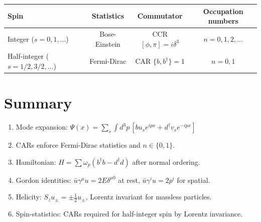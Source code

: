 \documentclass[12pt]{article}
\begin{document}
\begin{center}
\begin{tabular}{l|c|c|c}
Spin & Statistics & Commutator & Occupation numbers \\ \hline
Integer ($s=0,1,\dots$) & Bose-Einstein & CCR $[\phi,\pi]=i\delta^3$ & $n=0,1,2,\dots$ \\
Half-integer ($s=1/2,3/2,\dots$) & Fermi-Dirac & CAR $\{b,b^\dagger\}=1$ & $n=0,1$ \\
\end{tabular}
\end{center}

\vfill
\section*{Summary}

\begin{enumerate}
\item Mode expansion: $\Psi(x)=\sum_s\int\!d^3p\,[bu_s e^{ipx}+d^\dagger v_s e^{-ipx}]$
\item CARs enforce Fermi-Dirac statistics and $n\in\{0,1\}$.
\item Hamiltonian: $H=\sum\omega_p(b^\dagger b-d^\dagger d)$ after normal ordering.
\item Gordon identities: $\bar u\gamma^\mu u = 2E\delta^{\mu0}$ at rest, $\bar u\gamma^i u=2p^i$ for spatial.
\item Helicity: $S_z u_\pm = \pm\frac{1}{2}u_\pm$, Lorentz invariant for massless particles.
\item Spin-statistics: CARs required for half-integer spin by Lorentz invariance.
\end{enumerate}
\end{document}
